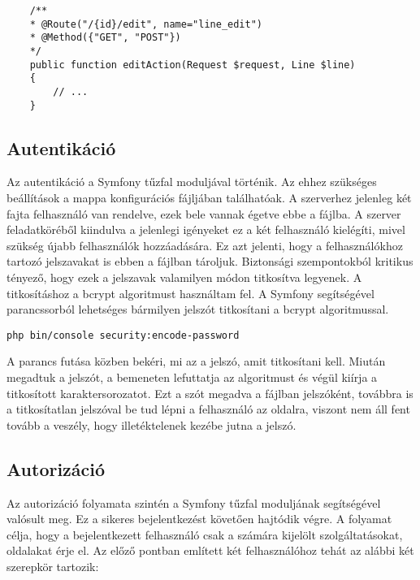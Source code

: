 \begin{lstlisting}
    /**
    * @Route("/{id}/edit", name="line_edit")
    * @Method({"GET", "POST"})
    */
    public function editAction(Request $request, Line $line)
    {
        // ...
    }
\end{lstlisting}

\subsection*{Autentikáció}
\label{authentication}

Az autentikáció a Symfony tűzfal moduljával történik. 
Az ehhez szükséges beállítások a  mappa  konfigurációs fájljában találhatóak. 
A szerverhez jelenleg két fajta felhasználó van rendelve, ezek bele vannak égetve ebbe a fájlba. 
A szerver feladatköréből kiindulva a jelenlegi igényeket ez a két felhasználó kielégíti, mivel szükség újabb felhasználók hozzáadására. 
Ez azt jelenti, hogy a felhasználókhoz tartozó jelszavakat is ebben a fájlban tároljuk. 
Biztonsági szempontokból kritikus tényező, hogy ezek a jelszavak valamilyen módon titkosítva legyenek. 
A titkosításhoz a bcrypt algoritmust használtam fel. 
A Symfony segítségével parancssorból lehetséges bármilyen jelszót titkosítani a bcrypt algoritmussal. 

\begin{lstlisting}
php bin/console security:encode-password
\end{lstlisting}

A parancs futása közben bekéri, mi az a jelszó, amit titkosítani kell. 
Miután megadtuk a jelszót, a bemeneten lefuttatja az algoritmust és végül kiírja a titkosított karaktersorozatot. 
Ezt a szót megadva a fájlban jelszóként, továbbra is a titkosítatlan jelszóval be tud lépni a felhasználó az oldalra, viszont nem áll fent tovább a veszély, hogy illetéktelenek kezébe jutna a jelszó. 

\subsection*{Autorizáció}
\label{authorization}

Az autorizáció folyamata szintén a Symfony tűzfal moduljának segítségével valósult meg. 
Ez a sikeres bejelentkezést követően hajtódik végre. 
A folyamat célja, hogy a bejelentkezett felhasználó csak a számára kijelölt szolgáltatásokat, oldalakat érje el. 
Az előző pontban említett két felhasználóhoz tehát az alábbi két szerepkör tartozik:

